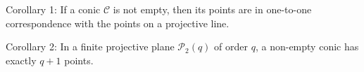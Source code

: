 Corollary 1: If a conic $\mathcal{C}$ is not empty, then its points are in one-to-one correspondence with the points on a projective line.

Corollary 2: In a finite projective plane $\mathcal{P}_2(q)$ of order $q$, a non-empty conic has exactly $q+1$ points.
